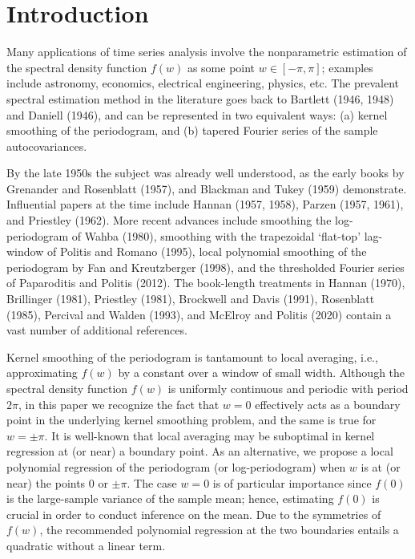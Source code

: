 \documentclass[12p E.Lt,psfig]{article} %
\begin{document}
\newpage
\section{Introduction}


Many applications of
time series analysis involve the nonparametric estimation
  of the spectral density function $f(w)$ as some point $w\in [-\pi, \pi]$; examples include
astronomy, economics, electrical engineering, physics, etc.
The prevalent spectral estimation  method in the literature
goes back to Bartlett (1946, 1948) and Daniell (1946),
and can be represented in two equivalent ways:
(a) kernel smoothing of the periodogram,  and
(b)  tapered Fourier series of the sample autocovariances.

 By the late 1950s the subject was
already well understood, as the early books
by Grenander  and   Rosenblatt  (1957), and
  Blackman  and Tukey (1959) demonstrate.
Influential papers at the time include Hannan  (1957, 1958),
 Parzen (1957, 1961), and Priestley  (1962).
More recent advances include smoothing the log-periodogram of
Wahba (1980), smoothing with the trapezoidal `flat-top' lag-window
of Politis and Romano (1995),  local polynomial smoothing of  the periodogram by
 Fan  and Kreutzberger  (1998), and the  thresholded Fourier series of
Paparoditis  and    Politis  (2012).
The book-length treatments in
Hannan (1970), Brillinger (1981),  Priestley (1981),
Brockwell and Davis (1991),   Rosenblatt (1985),
  Percival  and Walden (1993), and McElroy and Politis (2020)
contain a vast number of additional references.


Kernel smoothing of the periodogram is tantamount to local averaging, i.e., approximating
$f(w)$ by a constant over a window of small width.
Although the spectral density function $f(w)$ is uniformly continuous and periodic with period $2\pi$,
 in this paper we recognize the fact that   $w=0$   effectively
acts as a boundary point in the underlying kernel smoothing problem, and
the same is true for   $w=\pm \pi$.
It is well-known that local averaging may be suboptimal in kernel regression
at (or near) a boundary point. As an alternative, we propose a
local polynomial regression of the periodogram (or log-periodogram)
when $w$ is at (or near) the points 0 or $\pm \pi$.
The case $w=0$ is of particular importance  since $f(0)$ is the large-sample
variance of the sample mean; hence,  estimating $f(0)$ is crucial in order to conduct
inference on the mean.
Due to the symmetries of $f(w)$, the recommended
polynomial regression at the two boundaries entails a quadratic without a linear term.
\end{document}
